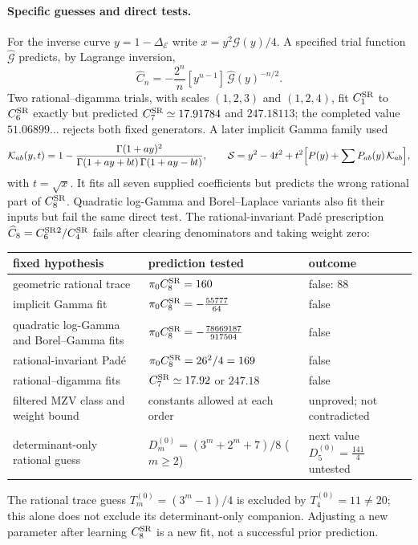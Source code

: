 \documentclass[11pt,a4paper]{article}
\numberwithin{equation}{section}
\newcommand{\De}{\Delta_{\mathcal E}}
\newcommand{\CSR}{C^{\rm SR}}
\begin{document}
\paragraph{Specific guesses and direct tests.} For the inverse curve $y=1-\De$ write $x=y^2\mathcal G(y)/4$. A
specified trial function $\widehat{\mathcal G}$ predicts, by Lagrange inversion,
\begin{equation}
 \widehat C_n=-\frac{2^n}{n}[y^{n-1}]\,\widehat{\mathcal G}(y)^{-n/2}.
\end{equation}
Two rational--digamma trials, with scales $(1,2,3)$ and $(1,2,4)$, fit $\CSR_1$ to $\CSR_6$ exactly but predicted
$\CSR_7\simeq17.91784$ and $247.18113$; the completed value $51.06899\ldots$ rejects both fixed generators. A later
implicit Gamma family used
\begin{equation}
 \mathcal K_{ab}(y,t)=1-\frac{\Gamma(1+ay)^2}{\Gamma(1+ay+bt)\,\Gamma(1+ay-bt)},\qquad
 \mathcal S=y^2-4t^2+t^2\Bigl[P(y)+\sum P_{ab}(y)\,\mathcal K_{ab}\Bigr],
\end{equation}
with $t=\sqrt x$. It fits all seven supplied coefficients but predicts the wrong rational part of $\CSR_8$. Quadratic
log-Gamma and Borel--Laplace variants also fit their inputs but fail the same direct test. The rational-invariant
Pad\'e prescription $\widehat C_8=\CSR_6{}^2/\CSR_4$ fails after clearing denominators and taking weight zero:
\begin{center}\small
\begin{tabular}{@{}>{\raggedright\arraybackslash}p{}>{\raggedright\arraybackslash}p{}>{\raggedright\arraybackslash}p{}@{}}
\toprule
fixed hypothesis & prediction tested & outcome\\
\midrule
geometric rational trace & $\pi_0\CSR_8=160$ & false: $88$\\
implicit Gamma fit & $\pi_0\CSR_8=-\frac{55777}{64}$ & false\\
quadratic log-Gamma and Borel--Gamma fits & $\pi_0\CSR_8=-\frac{78669187}{917504}$ & false\\
rational-invariant Pad\'e & $\pi_0\CSR_8=26^2/4=169$ & false\\
rational--digamma fits & $\CSR_7\simeq17.92$ or $247.18$ & false\\
filtered MZV class and weight bound & constants allowed at each order & unproved; not contradicted\\
determinant-only rational guess & $D_m^{(0)}=(3^m+2^m+7)/8$ ($m\ge2$) & next value $D_5^{(0)}=\frac{141}{4}$ untested\\
\bottomrule
\end{tabular}
\end{center}
The rational trace guess $T_m^{(0)}=(3^m-1)/4$ is excluded by $T_4^{(0)}=11\ne20$; this alone does not exclude its
determinant-only companion. Adjusting a new parameter after learning $\CSR_8$ is a new fit, not a successful prior
prediction.
\end{document}
